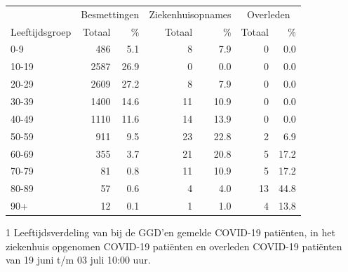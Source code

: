\documentclass[
  english,
  man,floatsintext]{apa6}
\begin{document}
\begin{table}
\centering\begingroup\fontsize{11}{13}\selectfont

\begin{threeparttable}
\begin{tabular}{lrrrrrr}
\toprule
\multicolumn{1}{c}{ } & \multicolumn{2}{c}{Besmettingen} & \multicolumn{2}{c}{Ziekenhuisopnames} & \multicolumn{2}{c}{Overleden} \\
\cmidrule(l{3pt}r{3pt}){2-3} \cmidrule(l{3pt}r{3pt}){4-5} \cmidrule(l{3pt}r{3pt}){6-7}
Leeftijdsgroep & Totaal & \% & Totaal & \% & Totaal & \%\\
\midrule
0-9 & 486 & 5.1 & 8 & 7.9 & 0 & 0.0\\
10-19 & 2587 & 26.9 & 0 & 0.0 & 0 & 0.0\\
20-29 & 2609 & 27.2 & 8 & 7.9 & 0 & 0.0\\
30-39 & 1400 & 14.6 & 11 & 10.9 & 0 & 0.0\\
40-49 & 1110 & 11.6 & 14 & 13.9 & 0 & 0.0\\
50-59 & 911 & 9.5 & 23 & 22.8 & 2 & 6.9\\
60-69 & 355 & 3.7 & 21 & 20.8 & 5 & 17.2\\
70-79 & 81 & 0.8 & 11 & 10.9 & 5 & 17.2\\
80-89 & 57 & 0.6 & 4 & 4.0 & 13 & 44.8\\
90+ & 12 & 0.1 & 1 & 1.0 & 4 & 13.8\\
\bottomrule
\end{tabular}
\begin{tablenotes}
\item[1] Leeftijdsverdeling van bij de GGD’en gemelde COVID-19 patiënten, in het ziekenhuis opgenomen COVID-19 patiënten en overleden COVID-19 patiënten van 19 juni t/m 03 juli 10:00 uur.
\end{tablenotes}
\end{threeparttable}
\endgroup{}
\end{table}

\newpage
\end{document}
